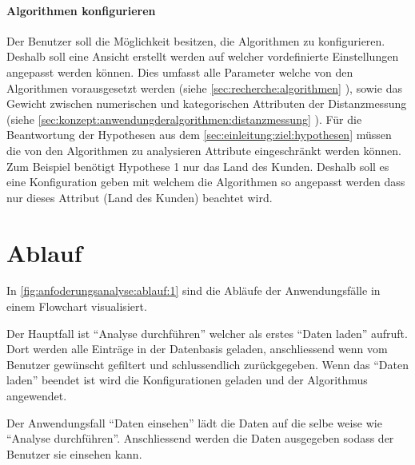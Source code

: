 \paragraph{Algorithmen konfigurieren} Der Benutzer soll die Möglichkeit besitzen, die Algorithmen zu konfigurieren. Deshalb soll eine Ansicht erstellt werden auf welcher vordefinierte Einstellungen angepasst werden können. Dies umfasst alle Parameter welche von den Algorithmen vorausgesetzt werden (siehe \cref{sec:recherche:algorithmen} ), sowie das Gewicht zwischen numerischen und kategorischen Attributen der Distanzmessung (siehe \cref{sec:konzept:anwendungderalgorithmen:distanzmessung} ). Für die Beantwortung der Hypothesen aus dem \cref{sec:einleitung:ziel:hypothesen}  müssen die von den Algorithmen zu analysieren Attribute eingeschränkt werden können. Zum Beispiel benötigt Hypothese 1 nur das Land des Kunden. Deshalb soll es eine Konfiguration geben mit welchem die Algorithmen so angepasst werden dass nur dieses Attribut (Land des Kunden) beachtet wird.



\section{Ablauf}
\label{sec:anforderungsanalyse:ablauf}
%
In \cref{fig:anfoderungsanalyse:ablauf:1} sind die Abläufe der Anwendungsfälle in einem Flowchart visualisiert. 

Der Hauptfall ist "`Analyse durchführen"' welcher als erstes "`Daten laden"' aufruft. Dort werden alle Einträge in der Datenbasis geladen, anschliessend wenn vom Benutzer gewünscht gefiltert und schlussendlich zurückgegeben. Wenn das "`Daten laden"' beendet ist wird die Konfigurationen geladen und der Algorithmus angewendet.

Der Anwendungsfall "`Daten einsehen"' lädt die Daten auf die selbe weise wie "`Analyse durchführen"'. Anschliessend werden die Daten ausgegeben sodass der Benutzer sie einsehen kann.

